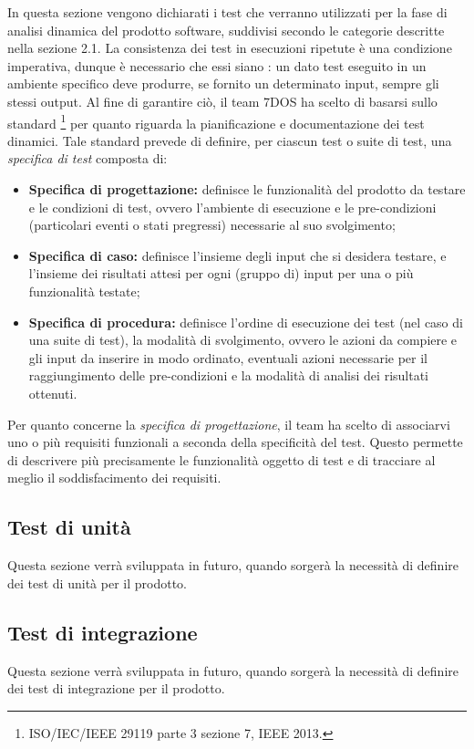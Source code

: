 
In questa sezione vengono dichiarati i test che verranno utilizzati per la fase di analisi dinamica del prodotto software, suddivisi secondo le categorie descritte nella sezione 2.1.
La consistenza dei test in esecuzioni ripetute è una condizione imperativa, dunque è necessario che essi siano : un dato test eseguito in un ambiente specifico deve produrre, se fornito un determinato input, sempre gli stessi output. Al fine di garantire ciò, il team 7DOS ha scelto di basarsi sullo standard \footnote{ISO/IEC/IEEE 29119 parte 3 sezione 7, IEEE 2013.} per quanto riguarda la pianificazione e documentazione dei test dinamici. Tale standard prevede di definire, per ciascun test o suite di test, una \emph{specifica di test} composta di:
\begin{itemize}
	\item {\textbf{Specifica di progettazione:} definisce le funzionalità del prodotto da testare e le condizioni di test, ovvero l'ambiente di esecuzione e le pre-condizioni (particolari eventi o stati pregressi) necessarie al suo svolgimento;}
	\item {\textbf{Specifica di caso:} definisce l'insieme degli input che si desidera testare, e l'insieme dei risultati attesi per ogni (gruppo di) input per una o più funzionalità testate;}
	\item {\textbf{Specifica di procedura:} definisce l'ordine di esecuzione dei test (nel caso di una suite di test), la modalità di svolgimento, ovvero le azioni da compiere e gli input da inserire in modo ordinato, eventuali azioni necessarie per il raggiungimento delle pre-condizioni e la modalità di analisi dei risultati ottenuti.}
\end{itemize}

Per quanto concerne la \emph{specifica di progettazione}, il team ha scelto di associarvi uno o più requisiti funzionali a seconda della specificità del test. Questo permette di descrivere più precisamente le funzionalità oggetto di test e di tracciare al meglio il soddisfacimento dei requisiti.
\subsection{Test di unità}
Questa sezione verrà sviluppata in futuro, quando sorgerà la necessità di definire dei test di unità per il prodotto.
\subsection{Test di integrazione}
Questa sezione verrà sviluppata in futuro, quando sorgerà la necessità di definire dei test di integrazione per il prodotto.
